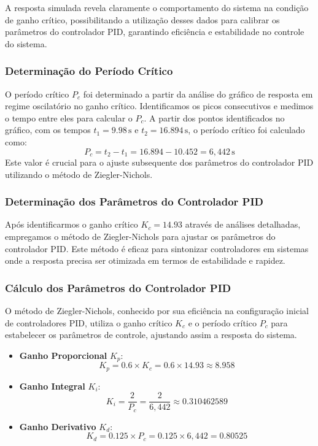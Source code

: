 A resposta simulada revela claramente o comportamento do sistema na condição de ganho crítico, possibilitando a utilização desses dados para calibrar os parâmetros do controlador PID, garantindo eficiência e estabilidade no controle do sistema.

\subsubsection{Determinação do Período Crítico}
O período crítico \( P_c \) foi determinado a partir da análise do gráfico de resposta em regime oscilatório no ganho crítico. Identificamos os picos consecutivos e medimos o tempo entre eles para calcular o \( P_c \). A partir dos pontos identificados no gráfico, com os tempos \( t_1 = 9.98 \, \text{s} \) e \( t_2 = 16.894 \, \text{s} \), o período crítico foi calculado como:
\[
    P_c = t_2 - t_1 = 16.894 - 10.452 = 6,442 \, \text{s}
\]
Este valor é crucial para o ajuste subsequente dos parâmetros do controlador PID utilizando o método de Ziegler-Nichols.


\subsubsection{Determinação dos Parâmetros do Controlador PID}
Após identificarmos o ganho crítico \( K_c = 14.93 \) através de análises detalhadas, empregamos o método de Ziegler-Nichols para ajustar os parâmetros do controlador PID. Este método é eficaz para sintonizar controladores em sistemas onde a resposta precisa ser otimizada em termos de estabilidade e rapidez.

\subsubsection{Cálculo dos Parâmetros do Controlador PID}
O método de Ziegler-Nichols, conhecido por sua eficiência na configuração inicial de controladores PID, utiliza o ganho crítico \( K_c \) e o período crítico \( P_c \) para estabelecer os parâmetros de controle, ajustando assim a resposta do sistema.

\begin{itemize}
    \item \textbf{Ganho Proporcional} \( K_p \):
          \[
              K_p = 0.6 \times K_c = 0.6 \times 14.93 \approx 8.958
          \]
    \item \textbf{Ganho Integral} \( K_i \):
          \[
              K_i = \frac{2}{P_c} = \frac{2}{6,442} \approx 0.310462589
          \]
    \item \textbf{Ganho Derivativo} \( K_d \):
          \[
              K_d = 0.125 \times P_c = 0.125 \times 6,442 = 0.80525
          \]
\end{itemize}

